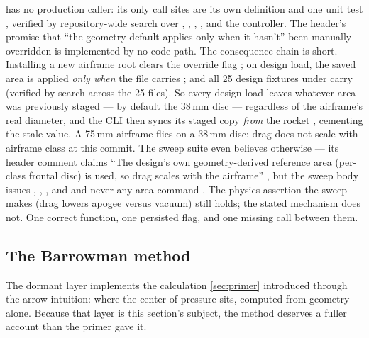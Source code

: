 \begin{hardfail}
 has no production caller: its only call sites are
its own definition  and one unit test
, verified by repository-wide search over ,
, , , and the controller. The header's promise that
``the geometry default applies only when it hasn't'' been manually overridden
 is implemented by no code path. The consequence chain is
short. Installing a new airframe root clears the override flag
; on design load, the saved area is applied \emph{only when}
the file carries 
; and all 25 design fixtures under
 carry  (verified by search
across the 25 files). So every design load leaves whatever area was previously staged --- by
default the 38\,mm disc --- regardless of the airframe's real diameter, and the CLI then
syncs its staged copy \emph{from} the rocket , cementing the stale
value. A 75\,mm airframe flies on a 38\,mm disc: drag does not scale with airframe class at
this commit. The sweep suite even believes otherwise --- its header comment claims ``The
design's own geometry-derived reference area (per-class frontal disc) is used, so drag
scales with the airframe'' , but the sweep body issues
, , , and  and never any
area command . The physics assertion the sweep makes
(drag lowers apogee versus vacuum) still holds; the stated mechanism does not. One correct
function, one persisted flag, and one missing call between them. \fail
\end{hardfail}

\subsection{The Barrowman method}\label{sec:aero-theory}

The dormant layer implements the calculation \cref{sec:primer} introduced through the arrow
intuition: where the center of pressure sits, computed from geometry alone. Because that
layer is this section's subject, the method deserves a fuller account than the primer gave
it.

